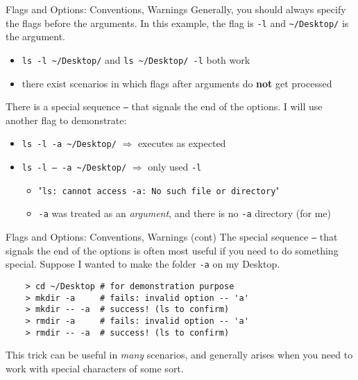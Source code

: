 \begin{frame}[fragile]{Flags and Options: Conventions, Warnings}
  Generally, you should always specify the flags before the arguments.  In this example, the flag is \texttt{-l} and
  \texttt{\textasciitilde/Desktop/} is the argument.
  \begin{itemize}
    \item \texttt{ls -l \textasciitilde/Desktop/} and \texttt{ls \textasciitilde/Desktop/ -l} both work
    \item there exist scenarios in which flags after arguments do \textbf{not} get processed
  \end{itemize}
  There is a special sequence \texttt{--} that signals the end of the options.  I will use another flag to demonstrate:
  \begin{itemize}
    \item \texttt{ls -l -a \textasciitilde/Desktop/} $\Rightarrow$ executes as expected
    \item \texttt{ls -l -- -a \textasciitilde/Desktop/} $\Rightarrow$ only used \texttt{-l}
    \begin{itemize}
      \item {\tiny "\texttt{ls: cannot access -a: No such file or directory}"}
      \item \texttt{-a} was treated as an \emph{argument}, and there is no \texttt{-a} directory (for me)
    \end{itemize}
  \end{itemize}
\end{frame}

\begin{frame}[fragile]{Flags and Options: Conventions, Warnings (cont)}
  The special sequence \texttt{--} that signals the end of the options is often most useful if you need to do something
  special.  Suppose I wanted to make the folder \texttt{-a} on my Desktop.

  \begin{verbatim}
    > cd ~/Desktop # for demonstration purpose
    > mkdir -a     # fails: invalid option -- 'a'
    > mkdir -- -a  # success! (ls to confirm)
    > rmdir -a     # fails: invalid option -- 'a'
    > rmdir -- -a  # success! (ls to confirm)
  \end{verbatim}

  This trick can be useful in \emph{many} scenarios, and generally arises when you need to work with special characters
  of some sort.
\end{frame}

